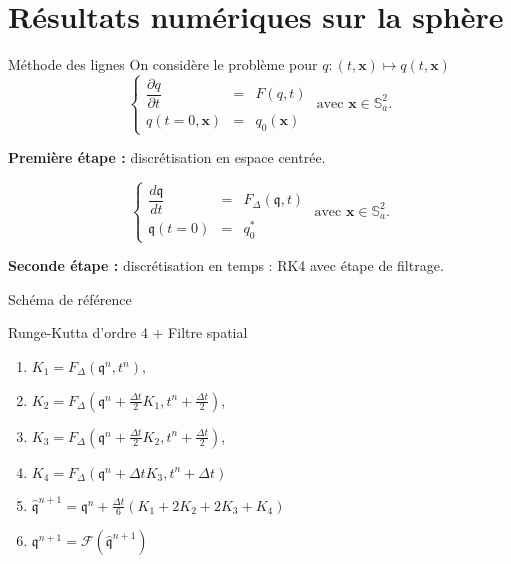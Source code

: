 \documentclass[11pt]{beamer}
\begin{document}
\section{Résultats numériques sur la sphère}
\begin{frame}{Méthode des lignes}
On considère le problème pour $q : (t,\mathbf{x}) \mapsto q(t,\mathbf{x})$
$$
\left\lbrace
\begin{array}{rcl}
\dfrac{\partial q}{\partial t} & = & F(q,t) \\
q(t=0,\mathbf{x}) & = & q_0(\mathbf{x})
\end{array}
\right. \text{ avec } \mathbf{x} \in \mathbb{S}_a^2.
$$
\begin{block}{}
\textbf{Première étape : } discrétisation en espace centrée.
\end{block}
$$
\left\lbrace
\begin{array}{rcl}
\dfrac{d \mathfrak{q}}{d t} & = & F_{\Delta}(\mathfrak{q},t) \\
\mathfrak{q}(t=0) & = & q_0^*
\end{array}
\right. \text{ avec } \mathbf{x} \in \mathbb{S}_a^2.
$$
\begin{block}{}
\textbf{Seconde étape : } discrétisation en temps : RK4 avec étape de filtrage.
\end{block}
\end{frame}






\begin{frame}{Schéma de référence}
\begin{block}{Runge-Kutta d'ordre 4 + Filtre spatial
}
\begin{enumerate}
\item $K_1 = F_{\Delta}(\mathfrak{q}^n, t^n)$,
\item $K_2 = F_{\Delta}(\mathfrak{q}^n + \frac{\Delta t}{2} K_1, t^n + \frac{\Delta t}{2})$,
\item $K_3 = F_{\Delta}(\mathfrak{q}^n + \frac{\Delta t}{2} K_2, t^n + \frac{\Delta t}{2})$,
\item $K_4 = F_{\Delta}(\mathfrak{q}^n + \Delta t K_3, t^n + \Delta t)$
\item $\hat{\mathfrak{q}}^{n+1} = \mathfrak{q}^n + \frac{\Delta t}{6} \left( K_1 + 2 K_2 + 2 K_3 + K_4 \right)$
\item $\mathfrak{q}^{n+1} = \mathcal{F}(\hat{\mathfrak{q}}^{n+1})$
\end{enumerate}
\end{block}
\end{frame}
\end{document}
